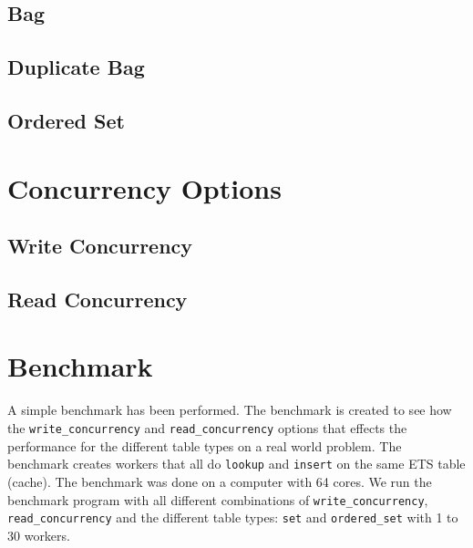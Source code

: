 \documentclass[aps,pre,preprint,nofootinbib]{revtex4}
\begin{document}
\subsection{Bag}
\subsection{Duplicate Bag}
\subsection{Ordered Set}


\section{Concurrency Options} \label{sec:concurrency_options}

\subsection{Write Concurrency}

\subsection{Read Concurrency}


\section{Benchmark} \label{sec:benchmark}

  A simple benchmark has been performed.
  The benchmark is created to see how the \verb|write_concurrency| and \verb|read_concurrency| options that effects the performance for the different table types on a real world problem.
  The benchmark creates workers that all do \verb|lookup| and \verb|insert| on the same ETS table (cache).
  The benchmark was done on a computer with 64 cores.
  We run the benchmark program with all different combinations of \verb|write_concurrency|, \verb|read_concurrency| and the different table types: \verb|set| and \verb|ordered_set| with 1 to 30 workers.
  
\end{document}
